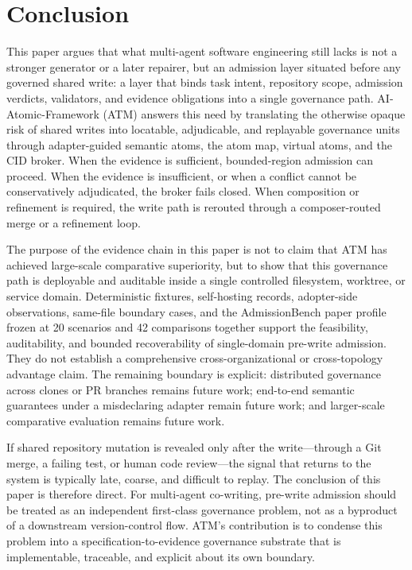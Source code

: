 \documentclass[9pt,letterpaper]{extarticle}
\begin{document}
\section{Conclusion}

This paper argues that what multi-agent software engineering still lacks is not a stronger generator or a later repairer, but an admission layer situated before any governed shared write: a layer that binds task intent, repository scope, admission verdicts, validators, and evidence obligations into a single governance path. AI-Atomic-Framework (ATM) answers this need by translating the otherwise opaque risk of shared writes into locatable, adjudicable, and replayable governance units through adapter-guided semantic atoms, the atom map, virtual atoms, and the CID broker. When the evidence is sufficient, bounded-region admission can proceed. When the evidence is insufficient, or when a conflict cannot be conservatively adjudicated, the broker fails closed. When composition or refinement is required, the write path is rerouted through a composer-routed merge or a refinement loop.

The purpose of the evidence chain in this paper is not to claim that ATM has achieved large-scale comparative superiority, but to show that this governance path is deployable and auditable inside a single controlled filesystem, worktree, or service domain. Deterministic fixtures, self-hosting records, adopter-side observations, same-file boundary cases, and the AdmissionBench paper profile frozen at 20 scenarios and 42 comparisons together support the feasibility, auditability, and bounded recoverability of single-domain pre-write admission. They do not establish a comprehensive cross-organizational or cross-topology advantage claim. The remaining boundary is explicit: distributed governance across clones or PR branches remains future work; end-to-end semantic guarantees under a misdeclaring adapter remain future work; and larger-scale comparative evaluation remains future work.

If shared repository mutation is revealed only after the write---through a Git merge, a failing test, or human code review---the signal that returns to the system is typically late, coarse, and difficult to replay. The conclusion of this paper is therefore direct. For multi-agent co-writing, pre-write admission should be treated as an independent first-class governance problem, not as a byproduct of a downstream version-control flow. ATM's contribution is to condense this problem into a specification-to-evidence governance substrate that is implementable, traceable, and explicit about its own boundary.
\end{document}
